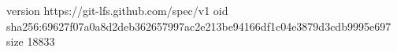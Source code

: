 version https://git-lfs.github.com/spec/v1
oid sha256:69627f07a0a8d2deb362657997ac2e213be94166df1c04e3879d3cdb9995e697
size 18833
